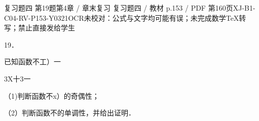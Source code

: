 \begin{bankitem}{复习题四 第19题}{第4章 / 章末复习 复习题四 / 教材 p.153 / PDF 第160页}{XJ-B1-C04-RV-P153-Y0321}{OCR未校对：公式与文字均可能有误；未完成数学TeX转写；禁止直接发给学生}
\begin{ocrdraft}
\par
19．
\par
已知函数不工）一
\par
3X十3一
\par
（1)判断函数不x）的奇偶性；
\par
（2）判断函数不的单调性，并给出证明．
\end{ocrdraft}
\end{bankitem}
